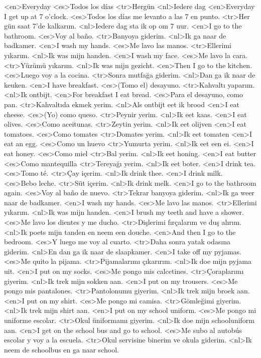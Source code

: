 <en>Everyday
<es>Todos los días
<tr>Hergün
<nl>Iedere dag
<en>Everyday I get up at 7 o’clock.
<es>Todos los días me levanto a las 7 en punto.
<tr>Her gün saat 7’de kalkarım.
<nl>Iedere dag sta ik op om 7 uur.
<en>I go to the bathroom.
<es>Voy al baño.
<tr>Banyoya giderim.
<nl>Ik ga naar de badkamer.
<en>I wash my hands.
<es>Me lavo las manos.
<tr>Ellerimi yıkarım.
<nl>Ik was mijn handen.
<en>I wash my face.
<es>Me lavo la cara.
<tr>Yüzümü yıkarım.
<nl>Ik was mijn gezicht.
<en>Then I go to the kitchen.
<es>Luego voy a la cocina.
<tr>Sonra mutfağa giderim.
<nl>Dan ga ik naar de keuken.
<en>I have breakfast.
<es>(Tomo el) desayuno.
<tr>Kahvaltı yaparım.
<nl>Ik ontbijt.
<en>For breakfast I eat bread.
<es>Para el desayuno, como pan.
<tr>Kahvaltıda ekmek yerim.
<nl>Als ontbijt eet ik brood
<en>I eat cheese.
<es>(Yo) como queso.
<tr>Peynir yerim.
<nl>Ik eet kaas.
<en>I eat olives.
<es>Como aceitunas.
<tr>Zeytin yerim.
<nl>Ik eet olijven
<en>I eat tomatoes.
<es>Como tomates
<tr>Domates yerim.
<nl>Ik eet tomaten
<en>I eat an egg.
<es>Como un huevo
<tr>Yumurta yerim.
<nl>Ik eet een ei.
<en>I eat honey.
<es>Como miel
<tr>Bal yerim.
<nl>Ik eet honing.
<en>I eat butter
<es>Como mantequilla
<tr>Tereyağı  yerim.
<nl>Ik eet boter.
<en>I drink tea.
<es>Tomo té.
<tr>Çay içerim.
<nl>Ik drink thee.
<en>I drink milk.
<es>Bebo leche.
<tr>Süt içerim.
<nl>Ik drink melk.
<en>I go to the bathroom again.
<es>Voy al baño de nuevo.
<tr>Tekrar banyoya giderim.
<nl>Ik ga weer naar de badkamer.
<en>I wash my hands.
<es>Me lavo las manos.
<tr>Ellerimi yıkarım.
<nl>Ik was mijn handen.
<en>I brush my teeth and have a shower.
<es>Me lavo los dientes y me ducho.
<tr>Dişlerimi fırçalarım ve duş alırım.
<nl>Ik poets mijn tanden en neem een douche.
<en>And then I go to the bedroom.
<es>Y luego me voy al cuarto.
<tr>Daha sonra yatak odasına giderim.
<nl>En dan ga ik naar de slaapkamer.
<en>I take off my pyjamas.
<es>Me quito la pijama.
<tr>Pijamalarımı çıkarırım.
<nl>Ik doe mijn pyjama uit.
<en>I put on my socks.
<es>Me pongo mis calcetines.
<tr>Çoraplarımı giyerim.
<nl>Ik trek mijn sokken aan.
<en>I put on my trousers.
<es>Me pongo mis pantalones.
<tr>Pantolonumu giyerim.
<nl>Ik trek mijn broek aan.
<en>I put on my shirt.
<es>Me pongo mi camisa.
<tr>Gömleğimi giyerim.
<nl>Ik trek mijn shirt aan.
<en>I put on my school uniform.
<es>Me pongo mi uniforme escolar.
<tr>Okul üniformamı giyerim.
<nl>Ik doe mijn schooluniform aan.
<en>I get on the school bus and go to school.
<es>Me subo al autobús escolar y voy a la escuela.
<tr>Okul servisine binerim ve okula giderim.
<nl>Ik neem de schoolbus  en ga naar school.

